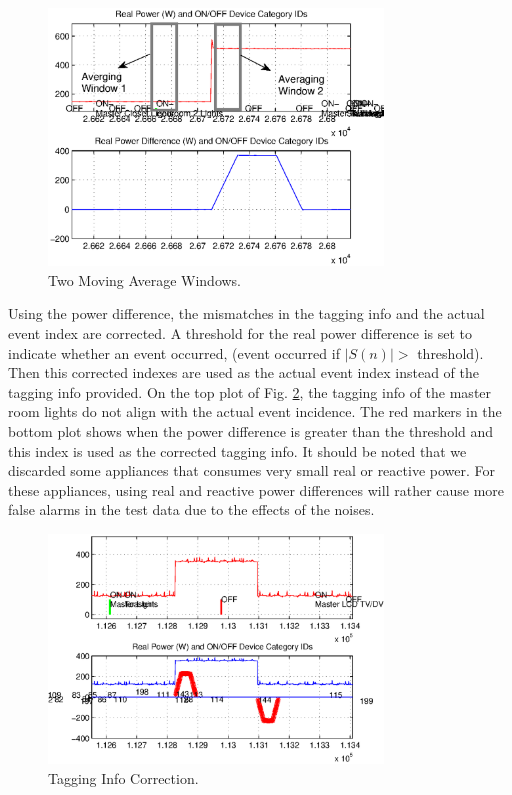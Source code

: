 \documentclass[conference]{IEEEtran}
\begin{document}
\begin{figure}[!t]
	\centering
	\includegraphics[width=3.5in]{fig/maw.eps}
	\caption{Two Moving Average Windows.}
	\label{fig:maw}
\end{figure}

Using the power difference,  the mismatches in the tagging info and the actual event index are corrected.  A threshold for the real power difference is set to indicate whether an event occurred, (event occurred if $|S(n)| >$ threshold).  Then this corrected indexes are used as the actual event index instead of the tagging info provided.  On the top plot of Fig. \ref{fig:tagging}, the tagging info of the master room lights do not align with the actual event incidence.  The red markers in the bottom plot shows when the power difference is greater than the threshold and this index is used as the corrected tagging info.  It should be noted that we discarded some appliances that consumes very small real or reactive power.  For these appliances, using real and reactive power differences will rather cause more false alarms in the test data due to the effects of the noises. 

\begin{figure}[!t]
	\centering
	\includegraphics[width=3.5in]{fig/masterlights.eps}
	\caption{Tagging Info Correction.}
	\label{fig:tagging}
\end{figure}
	
\end{document}
